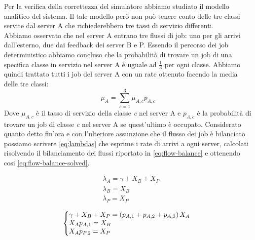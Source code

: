 Per la verifica della correttezza del simulatore abbiamo studiato il modello analitico del sistema. Il tale modello però non può tenere conto delle tre classi servite dal server A che richiederebbero tre tassi di servizio differenti.\\
Abbiamo osservato che nel server A entrano tre flussi di job: uno per gli arrivi dall'esterno, due dai feedback dei server B e P. Essendo il percorso dei job deterministico abbiamo concluso che la probabilità di trovare un job di una specifica classe in servizio nel server A è uguale ad $\frac{1}{3}$ per ogni classe. Abbiamo quindi trattato tutti i job del server A con un rate ottenuto facendo la media delle tre classi:
\begin{equation}
\displaystyle {\mu}_{A} = \sum_{c=1}^{3} {\mu}_{A,c} {p}_{A,c}
\end{equation}
Dove ${\mu}_{A,c}$ è il tasso di servizio della classe \textit{c} nel server A e ${p}_{A,c}$ è la probabilità di trovare un job di classe \textit{c} nel server A se quest'ultimo è occupato.
Considerato quanto detto fin'ora e con l'ulteriore assunzione che il flusso dei job è bilanciato possiamo scrivere \autoref{eq:lambdas} che esprime i rate di arrivi a ogni server, calcolati risolvendo il bilanciamento dei flussi riportato in \autoref{eq:flow-balance} e ottenendo cosi \autoref{eq:flow-balance-solved}.

\begin{equation}
  \begin{aligned}
    & \displaystyle {\lambda}_{A} = \gamma + {X}_{B} + {X}_{P}\\
    & \displaystyle {\lambda}_{B} = {X}_{B}\\
    & \displaystyle {\lambda}_{P} = {X}_{P}
  \end{aligned}
  \label{eq:lambdas}
\end{equation}

\begin{equation}
  \left\{\begin{array}{@{}l@{}}
    \displaystyle \gamma + {X}_{B} + {X}_{P} = \left({p}_{A,1} + {p}_{A,2} + {p}_{A,3}\right) {X}_{A}\\
    \displaystyle {X}_{A} {p}_{A,1} = {X}_{B}\\
    \displaystyle {X}_{A} {p}_{P,2} = {X}_{P}
  \end{array}\right.\
  \label{eq:flow-balance}
\end{equation}

